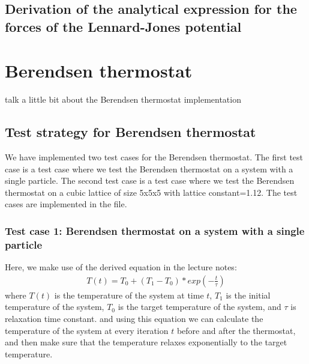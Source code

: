     \subsection{Derivation of the analytical expression for the forces of the Lennard-Jones potential}


    
\section{Berendsen thermostat}
    talk a little bit about the Berendsen thermostat implementation
    \subsection{Test strategy for Berendsen thermostat}
    We have implemented two test cases for the Berendsen thermostat. The first test case is a test case where we test the Berendsen thermostat on a system with a single particle. The second test case is a test case where we test the Berendsen thermostat on a cubic lattice of size 5x5x5 with lattice constant=1.12. The test cases are implemented in the file.

    \subsubsection{Test case 1: Berendsen thermostat on a system with a single particle}
    Here, we make use of the derived equation in the lecture notes:
    \begin{equation}
    \label{eq:berendsen}
        \begin{aligned}
            T(t) = T_0 + (T_1-T_0)*{exp(-\frac{t}{\tau})}
        \end{aligned}
    \end{equation}
    where $T(t)$ is the temperature of the system at time $t$, $T_1$ is the initial temperature of the system, $T_0$ is the target temperature of the system, and $\tau$ is relaxation time constant. and using this equation we can calculate the temperature of the system at every iteration $t$ before and after the thermostat, and then make sure that the temperature relaxes exponentially to the target temperature.

